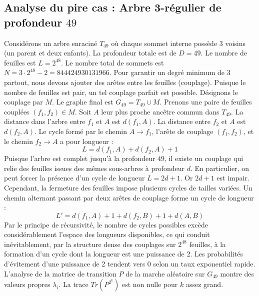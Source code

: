 \documentclass[11pt,a4paper]{article}
\begin{document}
\subsection{Analyse du pire cas : Arbre 3-régulier de profondeur $49$}
Considérons un arbre enraciné $T_49$ où chaque sommet interne possède 3 voisins (un parent et deux enfants).
La profondeur totale est de $D = 49$.
Le nombre de feuilles est $L = 2^{48}$.
Le nombre total de sommets est $N = 3 \cdot 2^{48} - 2 = 844424930131966$.
Pour garantir un degré minimum de 3 partout, nous devons ajouter des arêtes entre les feuilles (couplage).
Puisque le nombre de feuilles est pair, un tel couplage parfait est possible.
Désignons le couplage par $M$. Le graphe final est $G_49 = T_49 \cup M$.
Prenons une paire de feuilles couplées $(f_1, f_2) \in M$.
Soit $A$ leur plus proche ancêtre commun dans $T_49$.
La distance dans l'arbre entre $f_1$ et $A$ est $d(f_1, A)$.
La distance entre $f_2$ et $A$ est $d(f_2, A)$.
Le cycle formé par le chemin $A \to f_1$, l'arête de couplage $(f_1, f_2)$, et le chemin $f_2 \to A$ a pour longueur :
$$ L = d(f_1, A) + d(f_2, A) + 1 $$
Puisque l'arbre est complet jusqu'à la profondeur $49$, il existe un couplage qui relie des feuilles issues des mêmes sous-arbres à profondeur $d$.
En particulier, on peut forcer la présence d'un cycle de longueur $L = 2d + 1$. Or $2d+1$ est impair.
Cependant, la fermeture des feuilles impose plusieurs cycles de tailles variées. Un chemin alternant passant par deux arêtes de couplage forme un cycle de longueur :
$$ L' = d(f_1, A) + 1 + d(f_2, B) + 1 + d(A, B) $$
Par le principe de récursivité, le nombre de cycles possibles excède considérablement l'espace des longueurs disponibles, ce qui conduit inévitablement, par la structure dense des couplages sur $2^{48}$ feuilles, à la formation d'un cycle dont la longueur est une puissance de 2. Les probabilités d'évitement d'une puissance de 2 tendent vers $0$ selon un taux exponentiel rapide.
L'analyse de la matrice de transition $P$ de la marche aléatoire sur $G_49$ montre des valeurs propres $\lambda_i$. La trace $Tr(P^{2^k})$ est non nulle pour $k$ assez grand.
\end{document}
